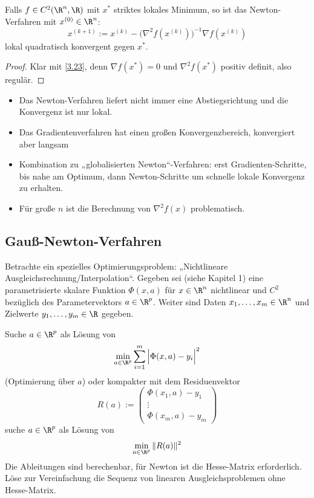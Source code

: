 \documentclass[11pt]{scrbook}
\begin{document}
\begin{kor} \label{4.26}
	Falls $f \in C^2 (\R^n, \R)$ mit $x^*$ striktes lokales Minimum, so ist das Newton-Verfahren mit $x^{(0)} \in \R^n$:
	\[
		x^{(k+1)} := x^{(k)} - \Big( \nabla^2 f(x^{(k)}) \Big)^{-1} \nabla f(x^{(k)})
	\]
	lokal quadratisch konvergent gegen $x^*$.
	\begin{proof}
		Klar mit \ref{3.23}, denn $\nabla f(x^*) = 0$ und $\nabla^2 f(x^*)$ positiv definit, also regulär.
	\end{proof}
	\begin{note}
		\begin{itemize}
			\item
				Das Newton-Verfahren liefert nicht immer eine Abstiegsrichtung und die Konvergenz ist nur lokal.
			\item
				Das Gradientenverfahren hat einen großen Konvergenzbereich, konvergiert aber langsam
			\item
				Kombination zu „globalisierten Newton“-Verfahren: erst Gradienten-Schritte, bis nahe am Optimum, dann Newton-Schritte um schnelle lokale Konvergenz zu erhalten.
			\item
				Für große $n$ ist die Berechnung von $\nabla^2 f(x)$  problematisch.
		\end{itemize}
	\end{note}
\end{kor}


\subsection{Gauß-Newton-Verfahren}


Betrachte ein spezielles Optimierungsproblem: „Nichtlineare Ausgleichsrechnung/Interpolation“.
Gegeben sei (siehe Kapitel 1) eine parametrisierte skalare Funktion $\Phi(x, a)$  für $x \in \R^n$ nichtlinear und $C^2$ bezüglich des Parametervektors $a \in \R^p$.
Weiter sind Daten $x_1, \dotsc, x_m \in \R^n$ und Zielwerte $y_1, \dotsc, y_m \in \R$ gegeben.

Suche $a \in \R^p$ als Lösung von
\[
	\min_{a \in \R^p} \sum_{i=1}^m \Big| \Phi(x,a) - y_i \Big|^2
\]
(Optimierung über $a$)
oder kompakter mit dem Residuenvektor
\[
	R(a) := \begin{pmatrix}
		\Phi(x_1,a) - y_1 \\
		\vdots \\
		\Phi(x_m, a) - y_m
	\end{pmatrix}
\]
suche $a \in \R^p$ als Lösung von
\[
	\min_{a \in \R^p} \|R(a)\|^2
\]
Die Ableitungen sind berechenbar, für Newton ist die Hesse-Matrix erforderlich.
Löse zur Vereinfachung die Sequenz von linearen Ausgleichsproblemen ohne Hesse-Matrix.
\end{document}
